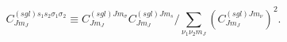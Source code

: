 \begin{equation}
C_{Jm_{J}}^{\left( sgl\right) s_{1}s_{2}\sigma _{1}\sigma _{2}}\equiv
C_{Jm_{J}}^{\left( sgl\right) Jm_{\sigma }}C_{Jm_{J}}^{\left( sgl\right)
Jm_{s}}/\sum_{\nu _{1}\nu _{2}m_{J}}\left( C_{Jm_{J}}^{\left( sgl\right)
Jm_{\nu }}\right) ^{2}.
\end{equation}

